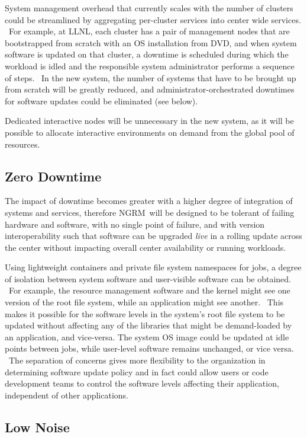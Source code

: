 \documentclass{article}
\newcommand{\ngrm}{NGRM}
\begin{document}
System management overhead that currently scales with the number of clusters
could be streamlined by aggregating per-cluster services into center wide
services.  For example, at LLNL, each cluster has a pair of management
nodes that are bootstrapped from scratch with an OS installation from DVD,
and when system software is updated on that cluster, a downtime is
scheduled during which the workload is idled and the responsible system
administrator performs a sequence of steps.  In the new system, the
number of systems that have to be brought up from scratch will be
greatly reduced, and administrator-orchestrated downtimes for software
updates could be eliminated (see below).

Dedicated interactive nodes will be unnecessary in the new system, as it
will be possible to allocate interactive environments on demand from the
global pool of resources.

\subsection{Zero Downtime}

The impact of downtime becomes greater with a higher degree of integration
of systems and services, therefore \ngrm\ will be designed to be tolerant
of failing hardware and software, with no single point of failure, and
with version interoperability such that software can be upgraded {\em live}
in a rolling update across the center without impacting overall center
availability or running workloads.

Using lightweight containers and private file system namespaces for jobs,
a degree of isolation between system software and user-visible software
can be obtained.  For example, the resource management software and the
kernel might see one version of the root file system, while an application
might see another.  This makes it possible for the software levels in
the system’s root file system to be updated without affecting any of the
libraries that might be demand-loaded by an application, and vice-versa.
The system OS image could be updated at idle points between jobs, while
user-level software remains unchanged, or vice versa.  The separation of
concerns gives more flexibility to the organization in determining software
update policy and in fact could allow users or code development teams to
control the software levels affecting their application, independent of
other applications.

\subsection{Low Noise}
\end{document}
